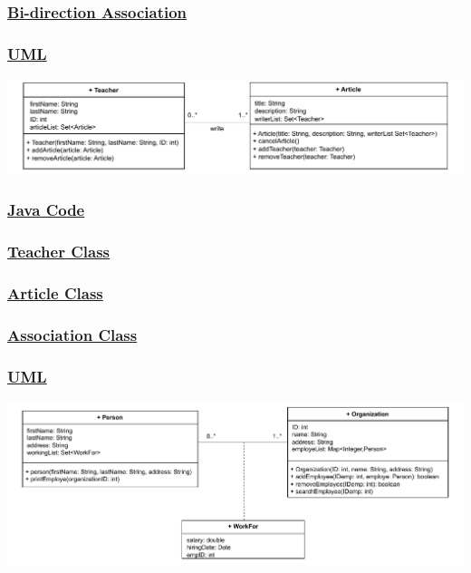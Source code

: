 \subsubsection*{\underline{Bi-direction Association}}
\subsubsection*{\underline{UML}}

\includegraphics[width=\textwidth]{Chapters/Diagram/OOP/EX2/ex2.c.drawio.pdf}

\subsubsection*{\underline{Java Code}}

\vspace{-0.2cm}
\subsubsection*{\underline{Teacher Class}}

\vspace{-0.2cm}


\subsubsection*{\underline{Article Class}}




\subsubsection*{\underline{Association Class}}
\subsubsection*{\underline{UML}}


\includegraphics[width=\textwidth]{Chapters/Diagram/OOP/EX2/ex2.d.drawio.pdf}


